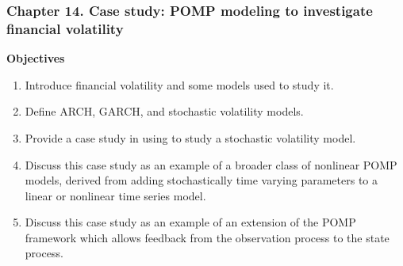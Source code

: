 \documentclass{beamer}
\newcommand\CHAPTER{14}
\begin{document}









\begin{frame}[fragile]
\frametitle{Chapter \CHAPTER. Case study: POMP modeling to investigate financial volatility}

\hspace{3cm} {\large \bf Objectives}

\vspace{3mm}

\begin{enumerate}

\item Introduce financial volatility and some models used to study it.

\item Define ARCH, GARCH, and stochastic volatility models. 

\item Provide a case study in using  to study a stochastic volatility model.

\item Discuss this case study as an example of a broader class of nonlinear POMP models, derived from adding stochastically time varying parameters to a linear or nonlinear time series model.

\item Discuss this case study as an example of an extension of the POMP framework which allows feedback from the observation process to the state process.

\end{enumerate}

\end{frame}
\end{document}
